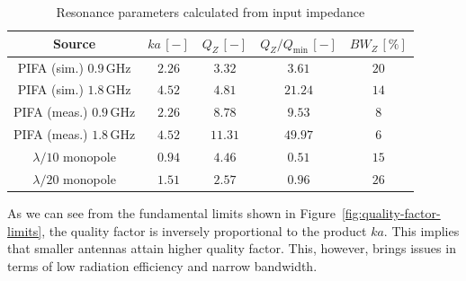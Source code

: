 \documentclass[11pt,a4paper]{article}
\begin{document}
            \begin{table}[!ht]
                \centering
                \begin{tabular}{|c||c|c|c|c|}
                    \hline
                    Source & $ka\, [-]$ & $Q_Z\, [-]$ & $Q_Z/Q_{\mathrm{min}}\, [-]$ & $\mathit{BW}_Z\, [\%]$\\
                    \hline\hline
                    \makecell{PIFA (sim.)\\$0.9\, \mathrm{GHz}$} & $2.26$ & $3.32$ & $3.61$ & $20$\\
                    \hline
                    \makecell{PIFA (sim.)\\$1.8\, \mathrm{GHz}$} & $4.52$ & $4.81$ & $21.24$ & $14$\\
                    \hline
                    \makecell{PIFA (meas.)\\$0.9\, \mathrm{GHz}$} & $2.26$ & $8.78$ & $9.53$ & $8$\\
                    \hline
                    \makecell{PIFA (meas.)\\$1.8\, \mathrm{GHz}$} & $4.52$ & $11.31$ & $49.97$ & $6$\\
                    \hline
                    \makecell{$\lambda/10$\\monopole} & $0.94$ &  $4.46$ & $0.51$ & $15$\\
                    \hline
                    \makecell{$\lambda/20$\\monopole} & $1.51$ & $2.57$ & $0.96$ & $26$\\
                    \hline
                \end{tabular}
                \caption{\label{table:quality-factor-qz}Resonance parameters calculated from input impedance}
            \end{table}

            As we can see from the fundamental limits shown in Figure~\ref{fig:quality-factor-limits}, the quality factor is inversely proportional to the product $ka$. This implies that smaller antennas attain higher quality factor. This, however, brings issues in terms of low radiation efficiency and narrow bandwidth.
        
\end{document}
